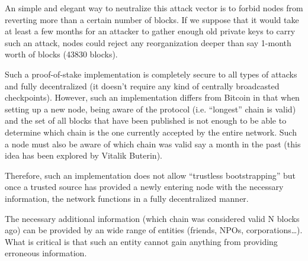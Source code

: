 \documentclass[a4paper,11pt]{article}
\begin{document}
An simple and elegant way to neutralize this attack vector is to forbid nodes from reverting more than a certain number of blocks.
If we suppose that it would take at least a few months for an attacker to gather enough old private keys to carry such an attack, nodes could reject any reorganization deeper than say 1-month worth of blocks (43830 blocks).

Such a proof-of-stake implementation is completely secure to all types of attacks and fully decentralized (it doesn’t require any kind of centrally broadcasted checkpoints).
However, such an implementation differs from Bitcoin in that when setting up a new node, being aware of the protocol (i.e. ``longest'' chain is valid) and the set of all blocks that have been published is not enough to be able to determine which chain is the one currently accepted by the entire network. Such a node must also be aware of which chain was valid say a month in the past (this idea has been explored by Vitalik Buterin\cite{weaksubjectivity}).

Therefore, such an implementation does not allow ``trustless bootstrapping'' but once a trusted source has provided a newly entering node with the necessary information, the network functions in a fully decentralized manner.

The necessary additional information (which chain was considered valid N blocks ago) can be provided by an wide range of entities (friends, NPOs, corporations…). What is critical is that such an entity cannot gain anything from providing erroneous information.


\end{document}
